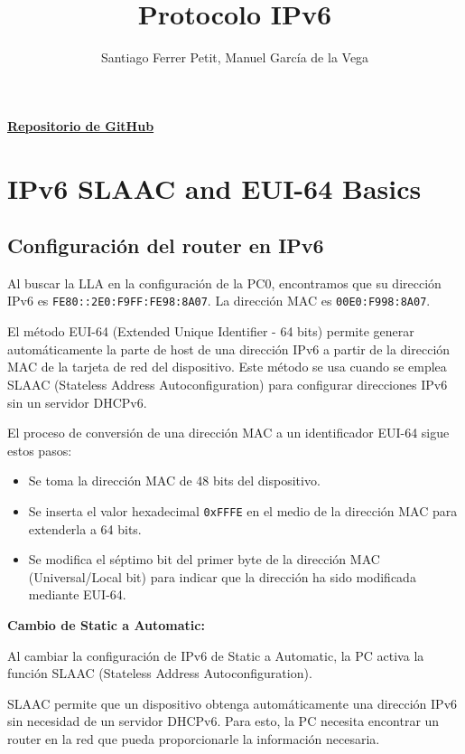 \documentclass[]{article}
\title{Protocolo IPv6}
\author{Santiago Ferrer Petit, Manuel García de la Vega}
\begin{document}
	
	\maketitle
	 \textbf{\href{https://github.com/santiferrerpetit/IPv6}{Repositorio de GitHub}}
	
	\section{\textbf{IPv6 SLAAC and EUI-64 Basics}}
	
	\subsection{\textbf{Configuración del router en IPv6}}
	
	Al buscar la LLA en la configuración de la PC0, encontramos que su dirección IPv6 es \texttt{FE80::2E0:F9FF:FE98:8A07}.  
	La dirección MAC es \texttt{00E0:F998:8A07}.
	
	El método EUI-64 (Extended Unique Identifier - 64 bits) permite generar automáticamente la parte de host de una dirección IPv6 a partir de la dirección MAC de la tarjeta de red del dispositivo.  
	Este método se usa cuando se emplea SLAAC (Stateless Address Autoconfiguration) para configurar direcciones IPv6 sin un servidor DHCPv6.
	
	El proceso de conversión de una dirección MAC a un identificador EUI-64 sigue estos pasos:
	
	\begin{itemize}
		\item Se toma la dirección MAC de 48 bits del dispositivo.
		\item Se inserta el valor hexadecimal \texttt{0xFFFE} en el medio de la dirección MAC para extenderla a 64 bits.
		\item Se modifica el séptimo bit del primer byte de la dirección MAC (Universal/Local bit) para indicar que la dirección ha sido modificada mediante EUI-64.
	\end{itemize}
	
	\textbf{Cambio de Static a Automatic:}
	
	Al cambiar la configuración de IPv6 de Static a Automatic, la PC activa la función SLAAC (Stateless Address Autoconfiguration).
	
	SLAAC permite que un dispositivo obtenga automáticamente una dirección IPv6 sin necesidad de un servidor DHCPv6.  
	Para esto, la PC necesita encontrar un router en la red que pueda proporcionarle la información necesaria.
	
\end{document}
